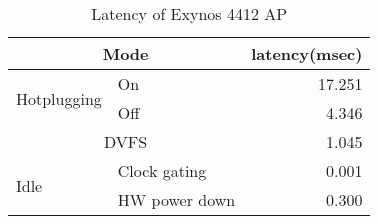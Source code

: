 \begin{table}[tb]
\begin{center}
\begin{footnotesize}
\begin{tabular}{l|l|r}
\hline \hline
\multicolumn{2}{c|}{Mode}	& 	latency(msec)	\\
\hline
\multirow{2}{*}{Hotplugging}	&	On	&	17.251 \\\cline{2-3}
				&	Off	& 4.346 \\
\hline
\multicolumn{2}{c|}{DVFS}	&	1.045	\\
\hline
\multirow{2}{*}{Idle}		&	Clock gating	&	0.001 \\ \cline{2-3}
				&	HW power down	& 	0.300 \\
\hline \hline
\end{tabular}
\end{footnotesize}
\end{center}
\caption{Latency of Exynos 4412 AP}
\end{table}

\begin{comment}
[Clock gating(WFI(Wait For Interrupt))]

WFI and WFE Standby modes disable most of the clocks of a processor, while keeping
its logic powered up. This reduces the power drawn to the static leakage current, leaving
a tiny clock power overhead requirement to enable the device to wake up.
Entry into WFI Standby mode is performed by executing the WFI instruction.



[ARM Power down mode]

Shutdown mode powers down the entire device, and all state, including cache, must be saved
externally by software. This state saving is performed with interrupts disabled, and finishes with
a Data Synchronization Barrier operation. The Cortex-A9 processor then communicates with a
power controller that the device is ready to be powered down in the same manner as when
entering Dormant Mode. The processor is returned to the run state by asserting reset.
\end{comment}
